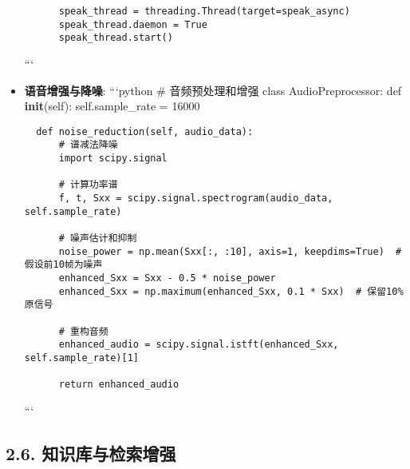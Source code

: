 \begin{itemize}
\begin{lstlisting}
      speak_thread = threading.Thread(target=speak_async)
      speak_thread.daemon = True
      speak_thread.start()
\end{lstlisting}

  ```
\item
  \textbf{语音增强与降噪}: ```python \# 音频预处理和增强 class
  AudioPreprocessor: def \textbf{init}(self): self.sample\_rate = 16000

\begin{lstlisting}
  def noise_reduction(self, audio_data):
      # 谱减法降噪
      import scipy.signal

      # 计算功率谱
      f, t, Sxx = scipy.signal.spectrogram(audio_data, self.sample_rate)

      # 噪声估计和抑制
      noise_power = np.mean(Sxx[:, :10], axis=1, keepdims=True)  # 假设前10帧为噪声
      enhanced_Sxx = Sxx - 0.5 * noise_power
      enhanced_Sxx = np.maximum(enhanced_Sxx, 0.1 * Sxx)  # 保留10%原信号

      # 重构音频
      enhanced_audio = scipy.signal.istft(enhanced_Sxx, self.sample_rate)[1]

      return enhanced_audio
\end{lstlisting}

  ```
\end{itemize}

\subsection{2.6.
知识库与检索增强}\label{ux77e5ux8bc6ux5e93ux4e0eux68c0ux7d22ux589eux5f3a}

